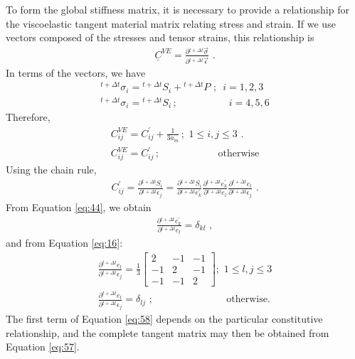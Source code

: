 To form the global stiffness matrix, it is necessary to provide a
relationship for the viscoelastic tangent material matrix relating
stress and strain. If we use vectors composed of the stresses and
tensor strains, this relationship is
\begin{gather}
\underline{C}^{VE}=\frac{\partial\phantom{}^{t+\Delta t}\overrightarrow{\sigma}}{\partial\phantom{}^{t+\Delta t}\overrightarrow{\epsilon}}\,\,.\label{eq:55}
\end{gather}
In terms of the vectors, we have
\begin{gather}
^{t+\Delta t}\sigma_{i}=\phantom{}^{t+\Delta t}S_{i}+\phantom{}^{t+\Delta t}P\,\,;\,\,\, i=1,2,3\label{eq:56}\\
^{t+\Delta t}\sigma_{i}=\phantom{}^{t+\Delta t}S_{i}\,;\,\,\,\,\,\,\,\,\,\,\,\,\,\,\,\,\,\,\,\,\,\,\,\,\,\,\,\,\,\,\, i=4,5,6\nonumber 
\end{gather}
Therefore,
\begin{gather}
C_{ij}^{VE}=C_{ij}^{\prime}+\frac{1}{3a_{m}}\,;\,\,1\leq i,j\leq3\,\,.\label{eq:57}\\
C_{ij}^{VE}=C_{ij}^{\prime}\,;\,\,\,\,\,\,\,\,\,\,\,\,\,\,\,\,\,\,\,\,\,\,\,\,\,\,\,\,\,\,\,\,\,\,\,\textrm{otherwise}\nonumber 
\end{gather}
Using the chain rule,
\begin{gather}
C_{ij}^{\prime}=\frac{\partial\phantom{}^{t+\Delta t}S_{i}}{\partial\phantom{}^{t+\Delta t}\epsilon_{j}}=\frac{\partial\phantom{}^{t+\Delta t}S_{i}}{\partial\phantom{}^{t+\Delta t}e_{k}^{\prime}}\frac{\partial\phantom{}^{t+\Delta t}e_{k}^{\prime}}{\partial\phantom{}^{t+\Delta t}e_{l}}\frac{\partial\phantom{}^{t+\Delta t}e_{l}}{\partial\phantom{}^{t+\Delta t}\epsilon_{j}}\,\,.\label{eq:58}
\end{gather}
From Equation \vref{eq:44}, we obtain
\begin{gather}
\frac{\partial\phantom{}^{t+\Delta t}e_{k}^{\prime}}{\partial\phantom{}^{t+\Delta t}e_{l}}=\delta_{kl}\,\,,\label{eq:59}
\end{gather}
and from Equation \vref{eq:16}:
\begin{gather}
\frac{\partial\phantom{}^{t+\Delta t}e_{l}}{\partial\phantom{}^{t+\Delta t}\epsilon_{j}}=\frac{1}{3}\left[\begin{array}{ccc}
2 & -1 & -1\\
-1 & 2 & -1\\
-1 & -1 & 2
\end{array}\right];\,\,1\leq l,j\leq3\label{eq:60}\\
\frac{\partial\phantom{}^{t+\Delta t}e_{l}}{\partial\phantom{}^{t+\Delta t}\epsilon_{j}}=\delta_{lj}\,\,;\,\,\,\,\,\,\,\,\,\,\,\,\,\,\,\,\,\,\,\,\,\,\,\,\,\,\,\,\,\,\,\,\,\,\,\,\,\,\,\,\,\,\,\,\textrm{otherwise.}\nonumber 
\end{gather}
The first term of Equation \vref{eq:58} depends on the particular
constitutive relationship, and the complete tangent matrix may then
be obtained from Equation \vref{eq:57}.


